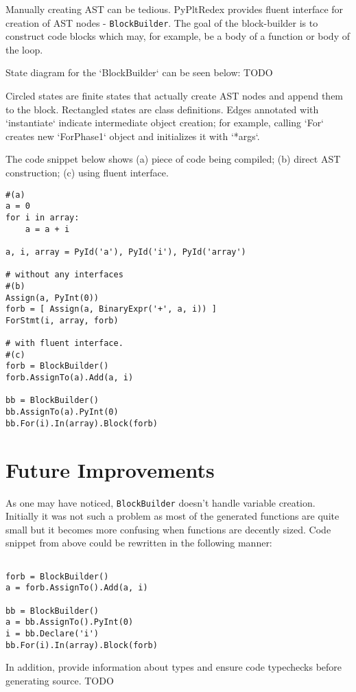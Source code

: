 Manually creating AST can be tedious. PyPltRedex provides fluent interface for creation of AST nodes - \texttt{BlockBuilder}. The goal of the block-builder is to construct code blocks which may, for example, be a body of a function or body of the loop. 

State diagram for the `BlockBuilder` can be seen below:
TODO

Circled states are finite states that actually create AST nodes and append them to the block. Rectangled states are class definitions. Edges annotated with `instantiate` indicate intermediate object creation; for example, calling `For` creates new `ForPhase1` object and initializes it with `*args`. 

The code snippet below shows (a) piece of code being compiled; (b) direct AST construction; (c) using fluent interface.
\begin{lstlisting}[caption=oh no!]
#(a)
a = 0
for i in array:
	a = a + i

a, i, array = PyId('a'), PyId('i'), PyId('array')

# without any interfaces
#(b)
Assign(a, PyInt(0))
forb = [ Assign(a, BinaryExpr('+', a, i)) ]
ForStmt(i, array, forb)

# with fluent interface.
#(c)
forb = BlockBuilder()
forb.AssignTo(a).Add(a, i)

bb = BlockBuilder()
bb.AssignTo(a).PyInt(0)
bb.For(i).In(array).Block(forb)
\end{lstlisting}


\section{Future Improvements}

As one may have noticed, \texttt{BlockBuilder} doesn't handle variable creation. Initially it was not such a problem as most of the generated functions are quite small but it becomes more confusing when functions are decently sized. Code snippet from above could be rewritten in the following manner:

\begin{lstlisting}[caption=Oh yes!]

forb = BlockBuilder()
a = forb.AssignTo().Add(a, i)

bb = BlockBuilder()
a = bb.AssignTo().PyInt(0)
i = bb.Declare('i')
bb.For(i).In(array).Block(forb)
\end{lstlisting}

 In addition, provide information about types and ensure code typechecks before generating source. TODO
